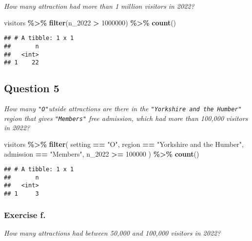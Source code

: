 \documentclass[
]{article}
\newenvironment{Shaded}{\begin{snugshade}}{\end{snugshade}}
\newcommand{\DecValTok}[1]{\textcolor[rgb]{0.00,0.00,0.81}{#1}}
\newcommand{\FunctionTok}[1]{\textcolor[rgb]{0.13,0.29,0.53}{\textbf{#1}}}
\newcommand{\NormalTok}[1]{#1}
\newcommand{\SpecialCharTok}[1]{\textcolor[rgb]{0.81,0.36,0.00}{\textbf{#1}}}
\newcommand{\StringTok}[1]{\textcolor[rgb]{0.31,0.60,0.02}{#1}}
\begin{document}
\emph{How many attraction had more than 1 million visitors in 2022?}

\begin{Shaded}
\begin{Highlighting}[]
\NormalTok{visitors }\SpecialCharTok{\%\textgreater{}\%} 
  \FunctionTok{filter}\NormalTok{(n\_2022 }\SpecialCharTok{\textgreater{}} \DecValTok{1000000}\NormalTok{) }\SpecialCharTok{\%\textgreater{}\%}
  \FunctionTok{count}\NormalTok{()}
\end{Highlighting}
\end{Shaded}

\begin{verbatim}
## # A tibble: 1 x 1
##       n
##   <int>
## 1    22
\end{verbatim}

\subsection{Question 5}\label{question-5}

\emph{How many \texttt{"O"}utside attractions are there in the
\texttt{"Yorkshire\ and\ the\ Humber"} region that gives
\texttt{"Members"} free admission, which had more than 100,000 visitors
in 2022?}

\begin{Shaded}
\begin{Highlighting}[]
\NormalTok{visitors }\SpecialCharTok{\%\textgreater{}\%}
  \FunctionTok{filter}\NormalTok{(}
\NormalTok{    setting }\SpecialCharTok{==} \StringTok{"O"}\NormalTok{,}
\NormalTok{    region }\SpecialCharTok{==} \StringTok{"Yorkshire and the Humber"}\NormalTok{,}
\NormalTok{    admission }\SpecialCharTok{==} \StringTok{"Members"}\NormalTok{,}
\NormalTok{    n\_2022 }\SpecialCharTok{\textgreater{}=} \DecValTok{100000}
\NormalTok{    ) }\SpecialCharTok{\%\textgreater{}\%}
  \FunctionTok{count}\NormalTok{()}
\end{Highlighting}
\end{Shaded}

\begin{verbatim}
## # A tibble: 1 x 1
##       n
##   <int>
## 1     3
\end{verbatim}

\subsubsection{Exercise f.}\label{exercise-f.}

\emph{How many attractions had between 50,000 and 100,000 visitors in
2022?}
\end{document}
